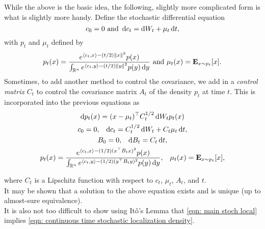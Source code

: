 \documentclass{article}
\begin{document}
		While the above is the basic idea, the following, slightly more complicated form is what is slightly more handy. Define the stochastic differential equation
		\begin{equation}
			\label{eqn: stochastic localization identity control}
			c_0 = 0 \text{ and } \operatorname{d}\!{c}_t = \operatorname{d}\!{W}_t + \mu_t\operatorname{d}\!{t},
		\end{equation}
		with $p_t$ and $\mu_t$ defined by
		\[ p_t(x) = \frac{e^{\langle c_t,x\rangle - (t/2)\left\lVert x\right\rVert^2}p(x)}{\int_{\mathbb{R}^n}e^{\langle c_t,y\rangle - (t/2)\left\lVert y\right\rVert^2}p(y)\operatorname{d}\!{y}}\text{ and } \mu_t(x) = \textbf{E}_{x\sim p_t} [x]. \]
		Sometimes, to add another method to control the covariance, we add in a \textit{control matrix} $C_t$ to control the covariance matrix $A_t$ of the density $p_t$ at time $t$. This is incorporated into the previous equations as
		\begin{equation}
			\label{eqn: main stoch local}
			\begin{gathered}
				\d{p_t}(x) =  (x - \mu_t)^\top C_t^{1/2} \d{W}_t p_t(x) \\
				c_0 = 0, \;\;\; \d{c}_t = C_t^{1/2}\d{W}_t + C_t\mu_t\d{t}, \\
				B_0 = 0, \;\;\; \d{B}_t = C_t\d{t}, \\
				p_t(x) = \frac{e^{\langle c_t,x\rangle - (1/2)(x^\top B_t x)^2}p(x)}{\int_{\Rn}e^{\langle c_t,y\rangle - (1/2)(y^\top B_t y)^2}p(y)\d{y}}, \;\;\; \mu_t(x) = \expec_{x\sim p_t} [x], \\	
			\end{gathered}
		\end{equation}

		where $C_t$ is a Lipschitz function with respect to $c_t$, $\mu_t$, $A_t$, and $t$.\\
		It may be shown that a solution to the above equation exists and is unique (up to almost-sure equivalence).\\
		It is also not too difficult to show using It\^{o}'s Lemma that \eqref{eqn: main stoch local} implies \eqref{eqn: continuous time stochastic localization density}.\\

\end{document}
